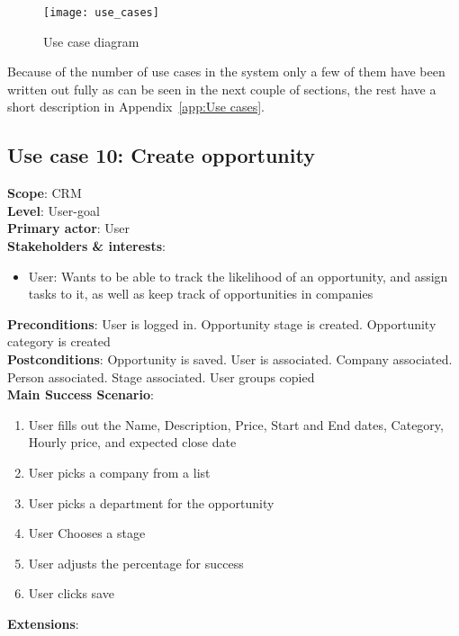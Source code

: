 \begin{figure}[!htb]
  \centering
  \texttt{[image: use\_cases]}
  \caption{Use case diagram}
\label{fig:usecase_diagram}
\end{figure}

Because of the number of use cases in the system only a few of them have been
written out fully as can be seen in the next couple of sections, the rest have a
short description in Appendix~\ref{app:Use cases}. 

\subsection{Use case 10: Create opportunity}
\textbf{Scope}: CRM \\
\textbf{Level}: User-goal \\
\textbf{Primary actor}: User \\
\textbf{Stakeholders \& interests}:
\begin{itemize}
  \item User: Wants to be able to track the likelihood of an opportunity, and
    assign tasks to it, as well as keep track of opportunities in companies 
\end{itemize}
\textbf{Preconditions}: User is logged in. Opportunity stage is created.
Opportunity category is created \\
\textbf{Postconditions}: Opportunity is saved. User is associated. Company
associated. Person associated. Stage associated. User groups copied\\ 
\textbf{Main Success Scenario}:
\begin{enumerate}
  \item User fills out the Name, Description, Price, Start and End dates,
    Category, Hourly price, and expected close date 
  \item User picks a company from a list
  \item User picks a department for the opportunity
  \item User Chooses a stage
  \item User adjusts the percentage for success
  \item User clicks save
\end{enumerate}
\textbf{Extensions}:
